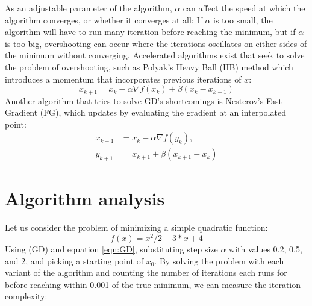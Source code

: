 As an adjustable parameter of the algorithm, $\alpha$ can affect the speed at which the algorithm converges, or whether it converges at all: If $\alpha$ is too small, the algorithm will have to run many iteration before reaching the minimum, but if $\alpha$ is too big, overshooting can occur where the iterations oscillates on either sides of the minimum without converging. Accelerated algorithms exist that seek to solve the problem of overshooting, such as Polyak’s Heavy Ball (HB) method which introduces a momentum that incorporates previous iterations of \(x\):
\begin{equation}\label{eqn:HB}
  x_{k+1}=x_k-\alpha \nabla f(x_k)+ \beta (x_k-x_{k-1})
\end{equation}
Another algorithm that tries to solve GD's shortcomings is Nesterov’s Fast Gradient (FG), which updates by evaluating the gradient at an interpolated point:
\begin{subequations} \label{eqn:FG}
  \begin{align}
    x_{k+1}     &=x_k-\alpha \nabla f(y_k), \label{eq_state}       \\
    y_{k+1} &=x_{k+1}+\beta (x_{k+1}-x_k) \label{eq_interpolated point}
  \end{align}
  \end{subequations}

\section{Algorithm analysis}
Let us consider the problem of minimizing a simple quadratic function:
\begin{equation} \label{eqn:quadratic}
    f(x) = x^2/2 - 3*x + 4
  \end{equation}
Using (GD) and equation \ref{eqn:GD}, substituting step size $\alpha$ with values 0.2, 0.5, and 2, and picking a starting point of $x_0$. By solving the problem with each variant of the algorithm and counting the number of iterations each runs for before reaching within 0.001 of the true minimum, we can measure the iteration complexity:

